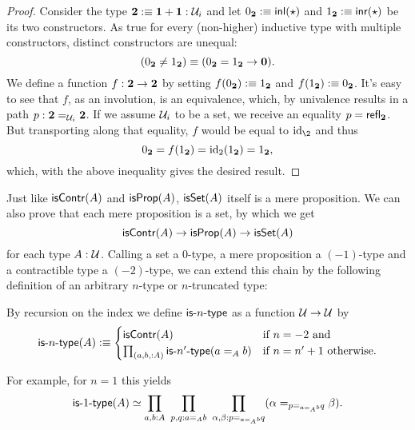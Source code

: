 \begin{proof}
Consider the type $\mathbf{2} :\equiv \mathbf{1} + \mathbf{1} : \mathcal{U}_i$ and let
$0_{\mathbf{2}} :\equiv \mathsf{inl}(\star)$ and $1_{\mathbf{2}} :\equiv \mathsf{inr}(\star)$ be its
two constructors.
As true for every (non-higher) inductive type with multiple constructors,
distinct constructors are unequal: %
\begin{equation*}
(0_{\mathbf{2}} \neq 1_{\mathbf{2}}) \equiv (0_{\mathbf{2}} = 1_{\mathbf{2}} \to \mathbf{0}) \text{.}
\end{equation*}
We define a function $f : \mathbf{2} \to \mathbf{2}$ by setting $f(0_{\mathbf{2}}) :\equiv 1_{\mathbf{2}}$
and $f(1_{\mathbf{2}}) :\equiv 0_{\mathbf{2}}$.
It's easy to see that $f$, as an involution, is an equivalence, which, by univalence
results in a path $p : \mathbf{2} =_{\mathcal{U}_i} \mathbf{2}$.
If we assume $\mathcal{U}_i$ to be a set, we receive an equality $p = \mathsf{refl}_{\mathbf{2}}$.
But transporting along that equality, $f$ would be equal to $\id_\2$ and thus
\begin{equation*}
0_{\mathbf{2}} = f(1_{\mathbf{2}}) = \operatorname{id}_2(1_{\mathbf{2}}) = 1_{\mathbf{2}} \text{,}
\end{equation*}
which, with the above inequality gives the desired result.
\end{proof}

Just like $\mathsf{isContr}(A)$ and $\mathsf{isProp}(A)$, $\mathsf{isSet}(A)$ itself is a mere proposition.
We can also prove that each mere proposition is a set, by which we get
\begin{equation*}
\mathsf{isContr}(A) \to \mathsf{isProp}(A) \to \mathsf{isSet}(A)
\end{equation*}
for each type $A : \mathcal{U}$. Calling a set a 0-type, a mere proposition a $(-1)$-type
and a contractible type a $(-2)$-type, we can extend this chain by the following
definition of an arbitrary $n$-type or $n$-truncated type:
\begin{defn}
By recursion on the index we define $\mathsf{is}\mbox{-}{n}\mbox{-}\mathsf{type}$ as a function $\mathcal{U} \to \mathcal{U}$ by
\begin{equation*}
\mathsf{is}\mbox{-}{n}\mbox{-}\mathsf{type}(A) :\equiv \begin{cases}
\mathsf{isContr}(A) & \text{if $n = -2$ and} \\
\prod_{(a, b, : A)} \mathsf{is}\mbox{-}{n'}\mbox{-}\mathsf{type}(a =_A b) & \text{if $n = n' + 1$ otherwise.}
\end{cases}
\end{equation*}
\end{defn}

For example, for $n = 1$ this yields
\begin{equation*}
\mathsf{is}\mbox{-}{1}\mbox{-}\mathsf{type}(A) \simeq \prod_{a, b : A} ~ \prod_{p, q : a =_A b}
	~ \prod_{\alpha, \beta : p =_{a =_A b} q} (\alpha =_{p =_{a =_A b} q} \beta) \text{.}
\end{equation*}

